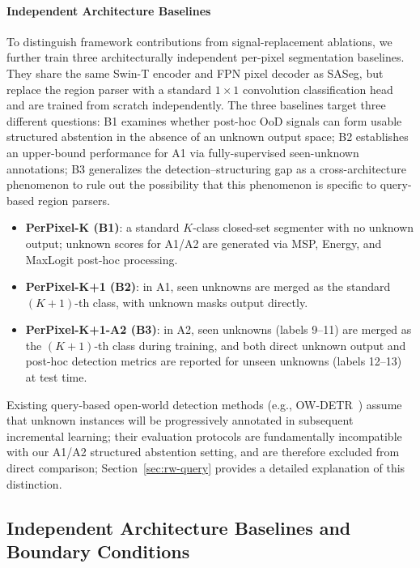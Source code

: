 \documentclass[3p,twocolumn,authoryear]{elsarticle}
\begin{document}
\paragraph{Independent Architecture Baselines}
To distinguish framework contributions from signal-replacement ablations, we further
train three architecturally independent per-pixel segmentation baselines.
They share the same Swin-T encoder and FPN pixel decoder as SASeg, but replace the
region parser with a standard $1 \times 1$ convolution classification head and are
trained from scratch independently.
The three baselines target three different questions: B1 examines whether post-hoc OoD
signals can form usable structured abstention in the absence of an unknown output space;
B2 establishes an upper-bound performance for A1 via fully-supervised seen-unknown
annotations; B3 generalizes the detection--structuring gap as a cross-architecture
phenomenon to rule out the possibility that this phenomenon is specific to query-based
region parsers.
\begin{itemize}[nosep]
  \item \textbf{PerPixel-K (B1)}: a standard $K$-class closed-set segmenter with no
        unknown output; unknown scores for A1/A2 are generated via MSP, Energy, and
        MaxLogit post-hoc processing.
  \item \textbf{PerPixel-K+1 (B2)}: in A1, seen unknowns are merged as the standard
        $(K+1)$-th class, with unknown masks output directly.
  \item \textbf{PerPixel-K+1-A2 (B3)}: in A2, seen unknowns (labels 9--11) are merged
        as the $(K+1)$-th class during training, and both direct unknown output and
        post-hoc detection metrics are reported for unseen unknowns (labels 12--13)
        at test time.
\end{itemize}
Existing query-based open-world detection methods (e.g., OW-DETR~\cite{gupta2021owdetr})
assume that unknown instances will be progressively annotated in subsequent incremental
learning; their evaluation protocols are fundamentally incompatible with our A1/A2
structured abstention setting, and are therefore excluded from direct comparison;
Section~\ref{sec:rw-query} provides a detailed explanation of this distinction.

\subsection{Independent Architecture Baselines and Boundary Conditions}\label{sec:exp:indep}
\end{document}
